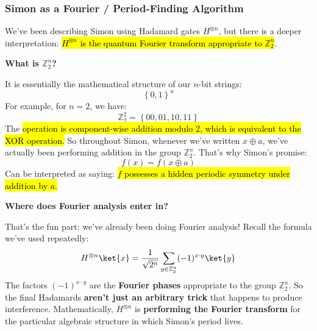 \subsubsection{Simon as a Fourier / Period-Finding Algorithm}\label{sec:simon-as-a-fourier-period-finding-algorithm}

We've been describing Simon using Hadamard gates $H^{\otimes n}$, but there is a deeper interpretation: \hl{$H^{\otimes n}$ is the quantum Fourier transform appropriate to $\mathbb{Z}_2^n$}.

\highspace
\begin{flushleft}
    \textcolor{Green3}{ \textbf{What is $\mathbb{Z}_2^n$?}}
\end{flushleft}
It is essentially the mathematical structure of our $n$-bit strings:
\begin{equation*}
    \left\{0, 1\right\}^{n}
\end{equation*}
For example, for $n=2$, we have:
\begin{equation*}
    \mathbb{Z}_2^2 = \left\{00, 01, 10, 11\right\}
\end{equation*}
The \hl{operation is component-wise addition modulo 2, which is equivalent to the XOR operation.} So throughout Simon, whenever we've written $x \oplus a$, we've actually been performing addition in the group $\mathbb{Z}_2^n$. That's why Simon's promise:
\begin{equation*}
    f(x) = f(x \oplus a)
\end{equation*}
Can be interpreted as saying: \hl{$f$ possesses a hidden periodic symmetry under addition by $a$.}

\highspace
\begin{flushleft}
    \textcolor{Green3}{ \textbf{Where does Fourier analysis enter in?}}
\end{flushleft}
That's the fun part: we've already been doing Fourier analysis! Recall the formula we've used repeatedly:
\begin{equation*}
    H^{\otimes n} \ket{x} = \frac{1}{\sqrt{2^n}} \sum_{y \in \mathbb{Z}_2^n} (-1)^{x \cdot y} \ket{y}
\end{equation*}
The factors $(-1)^{x \cdot y}$ are the \textbf{Fourier phases} appropriate to the group $\mathbb{Z}_2^n$. So the final Hadamards \textbf{aren't just an arbitrary trick} that happens to produce interference. Mathematically, $H^{\otimes n}$ is \textbf{performing the Fourier transform} for the particular algebraic structure in which Simon's period lives.

